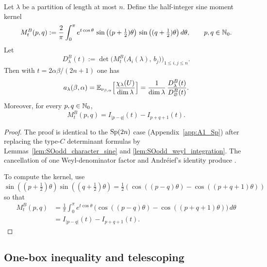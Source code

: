 \begin{proposition}
\label{prop:SOodd_det_formula}
Let $\lambda$ be a partition of length at most $n$.
Define the half-integer sine moment kernel
\begin{equation}
\label{eq:SOodd_kernel_def}
M_t^{B}(p,q)
:=\frac{2}{\pi}\int_0^{\pi} e^{t\cos\theta}\,\sin\big((p+\tfrac12)\theta\big)\,\sin\big((q+\tfrac12)\theta\big)\,d\theta,
\qquad p,q\in\mathbb N_0.
\end{equation}
Let
\begin{equation}
\label{eq:SOodd_Dlambda_def}
D_{\lambda}^{B}(t)
:=\det\Big(M_t^{B}\big(A_i(\lambda),\,b_j\big)\Big)_{1\le i,j\le n}.
\end{equation}
Then with $t=2\alpha\beta/(2n+1)$ one has
\begin{equation}
\label{eq:SOodd_coeff_det_ratio}
 a_{\lambda}(\beta,\alpha)
=\mathbb E_{\nu_{\beta,\alpha}}\Big[\frac{\chi_{\lambda}(U)}{\dim\lambda}\Big]
=\frac{1}{\dim\lambda}\,\frac{D_{\lambda}^{B}(t)}{D_{\varnothing}^{B}(t)}.
\end{equation}
Moreover, for every $p,q\in\mathbb N_0$,
\begin{equation}
\label{eq:SOodd_kernel_bessel}
M_t^{B}(p,q)=I_{|p-q|}(t)-I_{p+q+1}(t).
\end{equation}
\end{proposition}

\begin{proof}
The proof is identical to the $\mathrm{Sp}(2n)$ case (Appendix~\ref{app:A1_Sp}) after replacing the type-$C$ determinant formulas
by Lemmas~\ref{lem:SOodd_character_sine} and \ref{lem:SOodd_weyl_integration}.
The cancellation of one Weyl-denominator factor and Andr\'eief's identity produce .

To compute the kernel, use
\(\sin((p+\tfrac12)\theta)\sin((q+\tfrac12)\theta)=\tfrac12(\cos((p-q)\theta)-\cos((p+q+1)\theta))\)
so that
\begin{align*}
M_t^{B}(p,q)
&=\frac{1}{\pi}\int_0^{\pi} e^{t\cos\theta}\,\big(\cos((p-q)\theta)-\cos((p+q+1)\theta)\big)\,d\theta
\\
&=I_{|p-q|}(t)-I_{p+q+1}(t).
\end{align*}
\end{proof}

\subsection{One-box inequality and telescoping}
\label{subsec:A1_Spin_odd_one_box}


